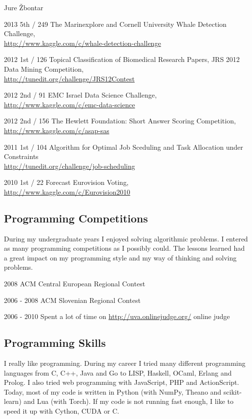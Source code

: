 \documentclass[12pt,a4paper]{article}
\begin{document}
\begin{cv}{Jure \v{Z}bontar}
\begin{cvlist}{}
\item[2013 \quad 5th / 249] The Marinexplore and Cornell University Whale Detection 
Challenge\footnotemark[1], \\
\url{http://www.kaggle.com/c/whale-detection-challenge}
\item[2012 \quad 1st / 126] Topical Classification of Biomedical Research Papers, 
JRS 2012 Data Mining Competition\footnotemark[2], \\
\url{http://tunedit.org/challenge/JRS12Contest}
\item[2012 \quad 2nd / 91] EMC Israel Data Science Challenge\footnotemark[2], \\
\url{http://www.kaggle.com/c/emc-data-science}
\item[2012 \quad 2nd / 156] The Hewlett Foundation: Short Answer Scoring 
Competition\footnotemark[1], \\
\url{http://www.kaggle.com/c/asap-sas}
\item[2011 \quad 1st / 104] Algorithm for Optimal Job Sceduling and Task 
Allocation under Constraints\footnotemark[1] \\
\url{http://tunedit.org/challenge/job-scheduling}
\item[2010 \quad 1st / 22] Forecast Eurovision Voting\footnotemark[1], \\
\url{http://www.kaggle.com/c/Eurovision2010}
\end{cvlist}

 
\subsection*{Programming Competitions}
During my undergraduate years I enjoyed solving algorithmic problems. I entered
as many programming competitions as I possibly could. The lessons learned
had a great impact on my programming style and my way of thinking and solving problems.

\begin{cvlist}{}
\item[2008] ACM Central European Regional Contest
\item[2006 - 2008] ACM Slovenian Regional Contest
\item[2006 - 2010] Spent a lot of time on \url{http://uva.onlinejudge.org/} online judge
\end{cvlist}

\subsection*{Programming Skills}
I really like programming. During my career I tried many different
programming languages from C, C++, Java and Go to LISP, Haskell, OCaml,
Erlang and Prolog. I also tried web programming with JavaScript, PHP and
ActionScript. Today, most of my code is written in Python (with NumPy,
Theano and scikit-learn) and Lua (with Torch). If my code is not running fast enough,
I like to speed it up with Cython, CUDA or C.

\end{cv}
\end{document}
